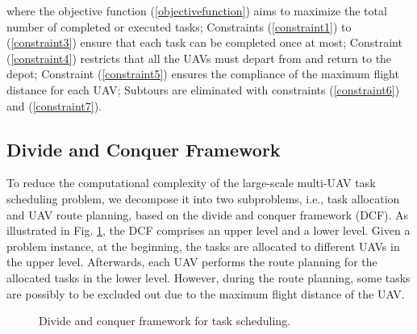 \documentclass[lettersize,journal]{IEEEtran}
\begin{document}
	where the objective function (\ref{objectivefunction}) aims to maximize the total number of completed or executed tasks; Constraints (\ref{constraint1}) to (\ref{constraint3}) ensure that each task can be completed once at most; Constraint (\ref{constraint4}) restricts that all the UAVs must depart from and return to the depot; Constraint (\ref{constraint5}) ensures the compliance of the maximum flight distance for each UAV; Subtours are eliminated with constraints (\ref{constraint6}) and (\ref{constraint7}).
	
	\subsection{Divide and Conquer Framework}
	
	To reduce the computational complexity of the large-scale multi-UAV task scheduling problem, we decompose it into two subproblems, i.e., task allocation and UAV route planning, based on the divide and conquer framework (DCF). As illustrated in Fig. \ref{Fig. 1}, the DCF comprises an upper level and a lower level. Given a problem instance, at the beginning,  the tasks are allocated to different UAVs in the upper level. Afterwards, each UAV performs the route planning for the allocated tasks in the lower level. However, during the route planning, some tasks are possibly to be excluded out due to the maximum flight distance of the UAV.
	
	\begin{figure}[htb]
		\caption{Divide and conquer framework for task scheduling.}
		\label{Fig. 1}
	\end{figure}
	
\end{document}
